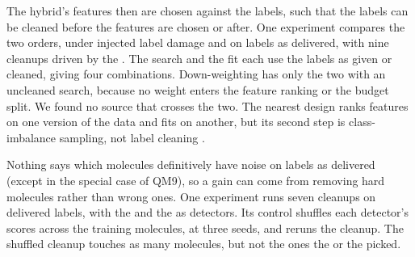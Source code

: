 The hybrid's features then are chosen against the labels, such that the labels can be cleaned before the features are chosen or after. One experiment compares the two orders, under injected label damage and on labels as delivered, with nine cleanups driven by the . The search and the fit each use the labels as given or cleaned, giving four combinations. Down-weighting has only the two with an uncleaned search, because no weight enters the feature ranking or the budget split. We found no source that crosses the two. The nearest design ranks features on one version of the data and fits on another, but its second step is class-imbalance sampling, not label cleaning \citep{Shanab2012}.

Nothing says which molecules definitively have noise on labels as delivered (except in the special case of QM9), so a gain can come from removing hard molecules rather than wrong ones. One experiment runs seven cleanups on delivered labels, with the  and the  as detectors. Its control shuffles each detector's scores across the training molecules, at three seeds, and reruns the cleanup. The shuffled cleanup touches as many molecules, but not the ones the  or the  picked.

